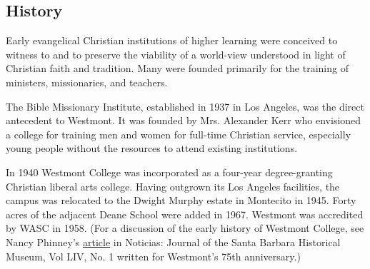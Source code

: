 \subsection{History}

   Early evangelical Christian institutions of higher learning were conceived to
   witness to and to preserve the viability of a world-view understood in light
   of Christian faith and tradition. Many were founded primarily for the
   training of ministers, missionaries, and teachers.

   The Bible Missionary Institute, established in 1937 in Los Angeles, was the
   direct antecedent to Westmont. It was founded by Mrs. Alexander Kerr who
   envisioned a college for training men and women for full-time Christian
   service, especially young people without the resources to attend existing
   institutions.

   In 1940 Westmont College was incorporated as a four-year degree-granting
   Christian liberal arts college. Having outgrown its Los Angeles facilities,
   the campus was relocated to the Dwight Murphy estate in Montecito in 1945.
   Forty acres of the adjacent Deane School were added in 1967. Westmont was
   accredited by WASC in 1958. (For a discussion of the early history of
   Westmont College, see Nancy Phinney's
   \href{http://www.santabarbaramuseum.com/noticias-article.pdf}{article} in
   Noticias: Journal of the Santa Barbara Historical Museum, Vol LIV, No. 1
   written for Westmont's 75th anniversary.)
   
